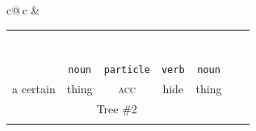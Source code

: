 \documentclass[a4paper,landscape,headrule,footrule,dvips]{foils}
\newcommand{\sa}[2]{\rnode{c#1}{\iz{#2}}}%
\begin{document}
\begin{CJK}{UTF8}{min}
{\begin{tabular}{c@{\,}c}
  &
  \begin{tabular}{ccccccc}
    &\multicolumn{5}{c}{\sa{1}{NP-frag}}  \\[1ex]
    &\multicolumn{5}{c}{\sa{2}{\wl{rel-clause}}}  \\[1ex]
    &\multicolumn{3}{c}{\sa{3}{hd-complement}} & \sa{4}{N} \\[1ex]
    \multicolumn{3}{c}{\sa{5}{hd-complement}} & \multicolumn{1}{c}{\sa{J}{\wl{subj-zpro}}} &
    \\[1ex]
    \multicolumn{2}{c}{\sa{I}{\ul{hd-specifier}}} & & \sa{K}{V} & & \\[1ex]
    \sa{H}{DET} & \sa{7}{N}      & \sa{8}{CASE-P} &   &  \\[1ex]
    \sa{G}{ある} & \sa{B}{物事} & \sa{C}{を} & \sa{D}{隠す} &  \sa{F}{ 物} \\
   \texttt{\emp{\ul{adnominal}}} & \texttt{noun} & \texttt{particle} & \texttt{verb} & \texttt{noun} \\
    a certain & thing &  \textsc{acc} & hide &  thing \\
   \multicolumn{5}{c}{Tree \#2} \\ \\
  \end{tabular}\\
  \centering
   
   
   
    
   
   
    



\end{tabular}}
\end{CJK}
\end{document}
